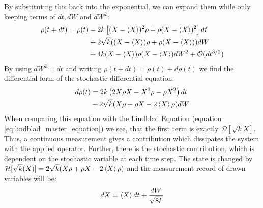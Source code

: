 By substituting this back into the exponential, we can expand them while only keeping terms of $dt, dW$ and $dW^2$:
\begin{align*}
    \rho(t+ dt) = \rho(t) &- 2k\left[(X - \expval{X})^2\rho + \rho(X - \expval{X})^2 \right]dt \\
                          &+ 2\sqrt{k}((X -\expval{X})\rho + \rho(X -\expval{X}))dW \\
                          &+ 4k (X -\expval{X})\rho (X -\expval{X}) dW^2 + \mathcal{O}(dt^{3/2})
\end{align*}
By using $dW^2 = dt$ and writing $\rho(t +dt) = \rho(t) + d\rho(t)$ we find the differential form of the stochastic differential equation:
\begin{align}
    d\rho(t) &=  2k\left(2 X\rho X - X^2\rho - \rho X^2\right)dt \\
                          &+ 2\sqrt{k}(X\rho + \rho X - 2 \expval{X}\rho)dW
\end{align}
When comparing this equation with the Lindblad Equation (equation \ref{eq:lindblad_master_equation}) we see, that the first term is exactly $\mathcal{D}[\sqrt{k}X]$. Thus, a continuous measurement gives a contribution which dissipates the system with the applied operator. Further, there is the stochastic contribution, which is dependent on the stochastic variable at each time step.  The state is changed by $\mathcal{H}[\sqrt{k}(X)]=2\sqrt{k}(X\rho + \rho X - 2 \expval{X}\rho)$ and the measurement record of drawn variables will be:
\begin{equation}
    dX = \expval{X}dt + \frac{dW}{\sqrt{8k}}
\end{equation}




